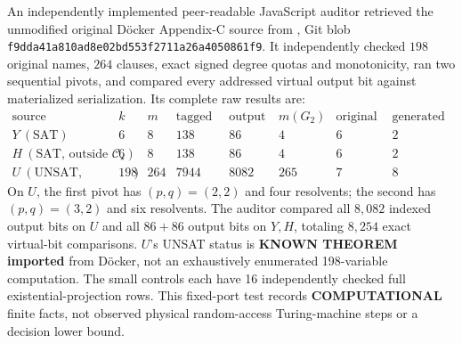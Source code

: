 \documentclass[11pt]{article}
\newcommand{\CS}{\mathcal C_\star}
\begin{document}
An independently implemented peer-readable JavaScript auditor retrieved the unmodified original D\"ocker Appendix-C source from
,
Git blob \texttt{f9dda41a810ad8e02bd553f2711a26a4050861f9}.
It independently checked $198$ original names, $264$ clauses, exact signed degree quotas and monotonicity, ran two sequential pivots, and compared every addressed virtual output bit against materialized serialization. Its complete raw results are:
\[
\begin{array}{c|rr|rr|rrr}
\text{source}&k&m&
\text{tagged input bits}&\text{output bits}&m(G_2)&
\text{original deleted}&\text{generated retained}\\\hline
Y\ (\text{SAT})&6&8&138&86&4&6&2\\
H\ (\text{SAT, outside }\CS)&6&8&138&86&4&6&2\\
U\ (\text{UNSAT, published})&198&264&7944&8082&265&7&8
\end{array}
\]
On $U$, the first pivot has $(p,q)=(2,2)$ and four resolvents; the second has $(p,q)=(3,2)$ and six resolvents. The auditor compared all $8{,}082$ indexed output bits on $U$ and all $86+86$ output bits on $Y,H$, totaling $8{,}254$ exact virtual-bit comparisons. $U$'s UNSAT status is \textbf{KNOWN THEOREM imported} from D\"ocker, not an exhaustively enumerated 198-variable computation. The small controls each have 16 independently checked full existential-projection rows. This fixed-port test records \textbf{COMPUTATIONAL} finite facts, not observed physical random-access Turing-machine steps or a decision lower bound.
\end{document}
